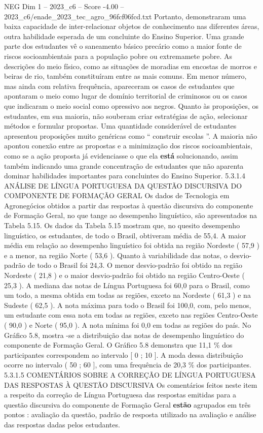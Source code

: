 \begin{textsample}{NEG Dim 1 – 2023\_c6 – Score -4.00 – 2023\_c6/enade\_2023\_tec\_agro\_96fcf06fcd.txt}
Portanto, demonstraram uma baixa capacidade de inter-relacionar objetos de conhecimento nas diferentes áreas, outra habilidade esperada de um concluinte do Ensino Superior.
Uma grande parte dos estudantes vê o saneamento básico precário como a maior fonte de riscos socioambientais para a população pobre ou extremamete pobre.
As descrições do meio físico, como as situações de moradias em encostas de morros e beiras de rio, também constituíram entre as mais comuns.
Em menor número, mas ainda com relativa frequência, apareceram os casos de estudantes que apontaram o meio como lugar de domínio territorial de criminosos ou os casos que indicaram o meio social como opressivo aos negros.
Quanto às proposições, os estudantes, em sua maioria, não souberam criar estratégias de ação, selecionar métodos e formular propostas.
Uma quantidade considerável de estudantes apresentou proposições muito genéricas como “ construir escolas ”.
A maioria não apontou conexão entre as propostas e a minimização dos riscos socioambientais, como se a ação proposta já evidenciasse o que ela \textbf{está} solucionando, assim também indicando uma grande concentração de estudantes que não aparenta dominar habilidades importantes para concluintes do Ensino Superior. 5.3.1.4 ANÁLISE DE LÍNGUA PORTUGUESA DA QUESTÃO DISCURSIVA DO COMPONENTE DE FORMAÇÃO GERAL Os dados de Tecnologia em Agronegócios obtidos a partir das respostas à questão discursiva do componente de Formação Geral, no que tange ao desempenho linguístico, são apresentados na Tabela 5.15.
Os dados da Tabela 5.15 mostram que, no quesito desempenho linguístico, os estudantes, de todo o Brasil, obtiveram média de 55,4.
A maior média em relação ao desempenho linguístico foi obtida na região Nordeste ( 57,9 ) e a menor, na região Norte ( 53,6 ).
Quanto à variabilidade das notas, o desvio-padrão de todo o Brasil foi 24,3.
O menor desvio-padrão foi obtido na região Nordeste ( 21,8 ) e o maior desvio-padrão foi obtido na região Centro-Oeste ( 25,3 ).
A mediana das notas de Língua Portuguesa foi 60,0 para o Brasil, como um todo, a mesma obtida em todas as regiões, exceto na Nordeste ( 61,3 ) e na Sudeste ( 62,5 ).
A nota máxima para todo o Brasil foi 100,0, com, pelo menos, um estudante com essa nota em todas as regiões, exceto nas regiões Centro-Oeste ( 90,0 ) e Norte ( 95,0 ).
A nota mínima foi 0,0 em todas as regiões do país.
No Gráfico 5.8, mostra -se a distribuição das notas de desempenho linguístico do componente de Formação Geral.
O Gráfico 5.8 demonstra que 11,1 \% dos participantes correspondem ao intervalo [ 0 ; 10 ].
A moda dessa distribuição ocorre no intervalo ( 50 ; 60 ], com uma frequência de 20,3 \% dos participantes. 5.3.1.5 COMENTÁRIOS SOBRE A CORREÇÃO DE LÍNGUA PORTUGUESA DAS RESPOSTAS À QUESTÃO DISCURSIVA Os comentários feitos neste item a respeito da correção de Língua Portuguesa das respostas emitidas para a questão discursiva do componente de Formação Geral \textbf{estão} agrupados em três pontos : avaliação da questão, padrão de resposta utilizado na avaliação e análise das respostas dadas pelos estudantes.

\end{textsample}
